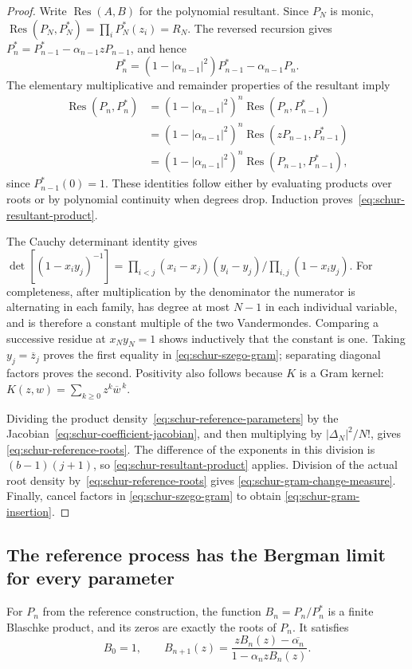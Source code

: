 \documentclass[11pt,a4paper]{article}
\numberwithin{equation}{section}
\theoremstyle{definition}
\theoremstyle{remark}
\begin{document}
\begin{proof}
Write $\operatorname{Res}(A,B)$ for the polynomial resultant. Since
$P_N$ is monic,
$\operatorname{Res}(P_N,P_N^*)=\prod_iP_N^*(z_i)=R_N$.
The reversed recursion gives
$P_n^*=P_{n-1}^*-\alpha_{n-1}zP_{n-1}$, and hence
\[
 P_n^*=(1-|\alpha_{n-1}|^2)P_{n-1}^*-\alpha_{n-1}P_n.
\]
The elementary multiplicative and remainder properties of the
resultant imply
\begin{align*}
 \operatorname{Res}(P_n,P_n^*)
 &=(1-|\alpha_{n-1}|^2)^n
          \operatorname{Res}(P_n,P_{n-1}^*)\\
 &=(1-|\alpha_{n-1}|^2)^n
          \operatorname{Res}(zP_{n-1},P_{n-1}^*)\\
 &=(1-|\alpha_{n-1}|^2)^n
          \operatorname{Res}(P_{n-1},P_{n-1}^*),
\end{align*}
since $P_{n-1}^*(0)=1$. These identities follow either by evaluating
products over roots or by polynomial continuity when degrees drop.
Induction proves~\eqref{eq:schur-resultant-product}.

The Cauchy determinant identity gives
$\det[(1-x_i y_j)^{-1}]=
\prod_{i<j}(x_i-x_j)(y_i-y_j)/\prod_{i,j}(1-x_i y_j)$.
For completeness, after multiplication by the denominator the
numerator is alternating in each family, has degree at most $N-1$
in each individual variable, and is therefore a constant multiple of
the two Vandermondes. Comparing a successive residue at $x_Ny_N=1$
shows inductively that the constant is one. Taking
$y_j=\overline z_j$ proves the first equality in
\eqref{eq:schur-szego-gram}; separating diagonal factors proves the
second. Positivity also follows because $K$ is a Gram kernel:
$K(z,w)=\sum_{k\ge0}z^k\overline w^{\,k}$.

Dividing the product density~\eqref{eq:schur-reference-parameters}
by the Jacobian~\eqref{eq:schur-coefficient-jacobian}, and then
multiplying by $|\Delta_N|^2/N!$, gives
\eqref{eq:schur-reference-roots}. The difference of the exponents in
this division is $(b-1)(j+1)$, so
\eqref{eq:schur-resultant-product} applies. Division of the actual
root density by~\eqref{eq:schur-reference-roots} gives
\eqref{eq:schur-gram-change-measure}. Finally, cancel factors in
\eqref{eq:schur-szego-gram} to obtain
\eqref{eq:schur-gram-insertion}.
\end{proof}

\subsection{The reference process has the Bergman limit for every parameter}
For $P_n$ from the reference construction, the function
$B_n=P_n/P_n^*$ is a finite Blaschke product, and its zeros are exactly
the roots of $P_n$. It satisfies
\begin{equation}
 B_0=1,\qquad
 B_{n+1}(z)=\frac{zB_n(z)-\overline{\alpha_n}}
                 {1-\alpha_nzB_n(z)}.
 \label{eq:schur-blaschke-recursion}
\end{equation}
\end{document}
